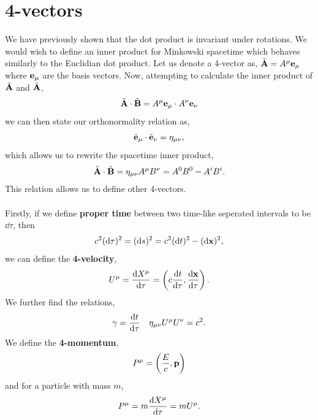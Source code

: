 \documentclass{book}
\begin{document}
\section{4-vectors}
We have previously shown that the dot product is invariant under rotations. We would wish to define an inner product for Minkowski spacetime which behaves similarly to the Euclidian dot product. Let us denote a 4-vector as, $\tilde{\vb{A}} = A^{\mu}\vb{e}_{\mu}$ where $\vb{e}_{\mu}$ are the basis vectors. Now, attempting to calculate the inner product of $\tilde{\vb{A}}$ and $\tilde{\vb{A}}$,
\begin{equation}
	\tilde{\vb{A}} \cdot \tilde{\vb{B}} = A^{\mu}\vb{e}_{\mu} \cdot A^{\nu}\vb{e}_{\nu}
\end{equation}
we can then state our orthonormality relation as,
\begin{equation}
	\tilde{\vb{e}}_{\mu}\cdot\tilde{\vb{e}}_{\nu} = \eta_{\mu\nu},
\end{equation}
which allows us to rewrite the spacetime inner product,
\begin{equation}
	\tilde{\vb{A}} \cdot \tilde{\vb{B}} = \eta_{\mu\nu}A^{\mu}B^{\nu} = A^0B^0 - A^iB^i.
\end{equation}
This relation allows us to define other 4-vectors. 
\\\\
Firstly, if we define \textbf{proper time} between two time-like seperated intervals to be $\dd{\tau}$, then
\begin{equation}
	c^2(\dd{\tau})^2 = (\dd{s})^2 = c^2(\dd{t})^2 - (\dd{\vb{x}})^2,
\end{equation}
we can define the \textbf{4-velocity},
\begin{equation}
	U^{\mu} = \dv{X^{\mu}}{\tau} = \left(c\dv{t}{\tau}, \dv{\vb{x}}{\tau}\right).
\end{equation}
We further find the relations,
\begin{align}
	\gamma = \dv{t}{\tau} && \eta_{\mu\nu}U^{\mu}U^{\nu} = c^2.
\end{align}
We define the \textbf{4-momentum},
\begin{equation}
	P^{\mu}	 = \left(\frac{E}{c}, \vb{p}\right) \label{4momentum}
\end{equation}
and for a particle with mass $m$,
\begin{equation}
	P^{\mu} = m \dv{X^{\mu}}{\tau} = mU^{\mu}.
\end{equation}
\end{document}
